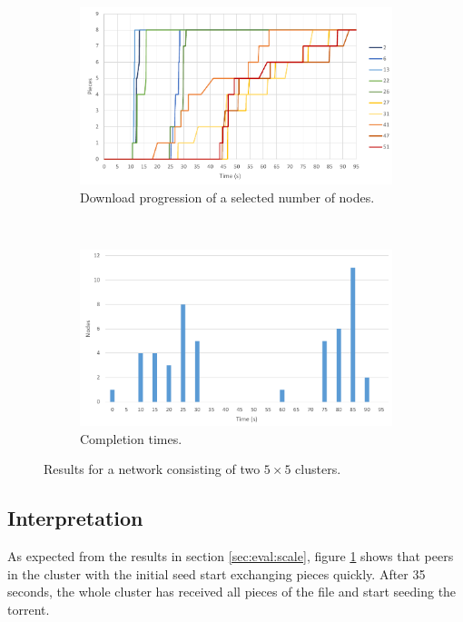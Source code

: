 \begin{figure}
	\centering
	\begin{subfigure}[b]{\textwidth}
		\centering
		\includegraphics[width=\linewidth]{graphs/cluster/two-cluster-seed-12-progress.pdf}
		\caption{Download progression of a selected number of nodes.}
		\label{fig:eval:hetero:progress}
	\end{subfigure}%
	\\
	\begin{subfigure}[b]{\textwidth}
		\centering
		\includegraphics[width=\linewidth]{graphs/cluster/two-cluster-seed-12-completion.pdf}
		\caption{Completion times.}
		\label{fig:eval:hetero:completion}
	\end{subfigure}
	\caption[Results for network consisting of two separate clusters]{Results for a network consisting of two $5 \times 5$ clusters.}
	\label{fig:eval:hetero:results}
\end{figure}

\subsection{Interpretation}
As expected from the results in section \ref{sec:eval:scale}, figure \ref{fig:eval:hetero:progress} shows that peers in the cluster with the initial seed start exchanging pieces quickly. After 35 seconds, the whole cluster has received all pieces of the file and start seeding the torrent.

